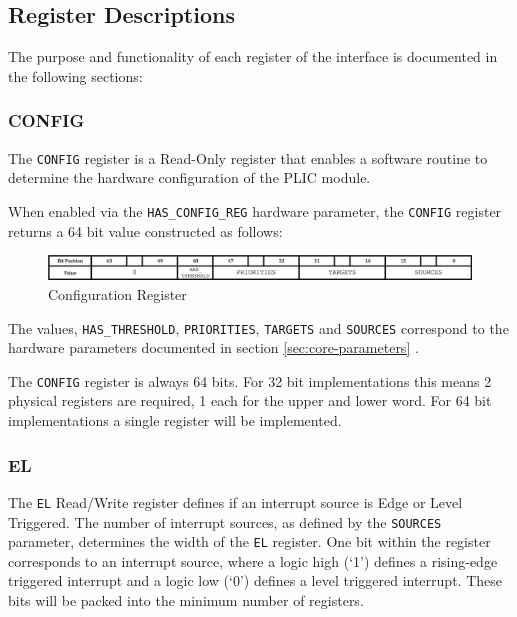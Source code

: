 \subsection{Register Descriptions}

The purpose and functionality of each register of the interface is documented in the following sections:

\subsubsection{CONFIG}

The \texttt{CONFIG} register is a Read-Only register that enables a
software routine to determine the hardware configuration of the PLIC
module.

When enabled via the \texttt{HAS\_CONFIG\_REG} hardware parameter, the
\texttt{CONFIG} register returns a 64 bit value constructed as follows:

\begin{figure}[h] 
	\includegraphics[width=\linewidth]{assets/img/CONFIG} 
	\caption[Configuration Register]{Configuration Register}
	\label{fig:configreg}
\end{figure}

The values, \texttt{HAS\_THRESHOLD}, \texttt{PRIORITIES},
\texttt{TARGETS} and \texttt{SOURCES} correspond to the hardware
parameters documented in section \ref{sec:core-parameters} .

The \texttt{CONFIG} register is always 64 bits. For 32 bit
implementations this means 2 physical registers are required, 1 each for
the upper and lower word. For 64 bit implementations a single register
will be implemented.

\subsubsection{EL}

The \texttt{EL} Read/Write register defines if an interrupt source is Edge or Level Triggered. The number of interrupt sources, as defined by the
\texttt{SOURCES} parameter, determines the width of the \texttt{EL} register. 
One bit within the register corresponds to an interrupt source, where a 
logic high (`1') defines a rising-edge triggered interrupt and a logic 
low (`0') defines a level triggered interrupt. These bits will be
packed into the minimum number of registers.

